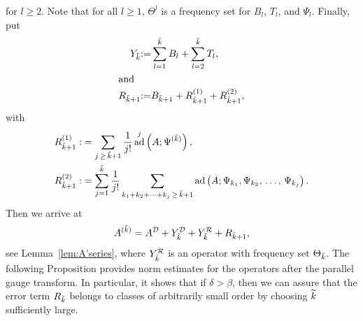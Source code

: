 \documentclass[AHL,Unicode,longabstracts,published]{cedram}
\DeclareMathOperator{\ad}{ad}
\newcommand{\CD}{\mathcal{D}}
\newcommand{\CR}{\mathcal{R}}
\let\oldtilde\tilde
\renewcommand*{\tilde}[1]{\mathchoice{\widetilde{#1}}{\widetilde{#1}}{\oldtilde{#1}}{\oldtilde{#1}}}
\begin{document}
for $l\geq 2$. Note that for all $l\geq 1$, $\Theta^l$ is a frequency set for $B_l$, $T_l$, and $\Psi_l$. Finally, put
\begin{align}
Y_{\tilde{k}}&{:=}\sum\limits_{l=1}^{\tilde{k}}B_l+\sum\limits_{l=2}^{\tilde{k}}T_l,\label{eq:defpsiytildek}
\\
\intertext{and}
R_{\tilde{k}+1} &{:=}B_{\tilde{k}+1}+R_{\tilde{k}+1}^{(1)}+R_{\tilde{k}+1}^{(2)},\label{eq:defR}
\end{align}
with
\begin{equation}
\begin{split}
R_{\tilde{k}+1}^{(1)}:&=\sum\limits_{j\,\geq\,\tilde{k}+1}\frac{1}{j!}\ad^j\left(A;\Psi^{(\tilde k)}\right),\\
R_{\tilde{k}+1}^{(2)}:&=\sum\limits_{j=1}^{\tilde{k}}\frac{1}{j!}\sum\limits_{k_1+k_2+\dots + k_j\,\geq\, \tilde{k}+1}\ad\left(A;\Psi_{k_1},\Psi_{k_2},\,\dots,\,\Psi_{k_j}\right).
\end{split}
\end{equation}
Then we arrive at
\begin{equation}\label{eq:afterparallelgauge}
A^{(\tilde k)}=A^\CD+Y_{\tilde{k}}^{\CD}+Y_{\tilde{k}}^{\CR}+R_{\tilde{k}+1},
\end{equation}
see Lemma~\ref{lem:A'series}, where $Y_{\tilde{k}}^{\CR}$ is an operator with frequency set $\Theta_{\tilde{k}}$. The following Proposition provides norm estimates for the operators after the parallel gauge transform. In particular, it shows that if $\delta>\beta$, then we can assure that the error term $R_{\tilde{k}}$ belongs to classes of arbitrarily small order by choosing $\tilde{k}$ sufficiently large.
\end{document}
